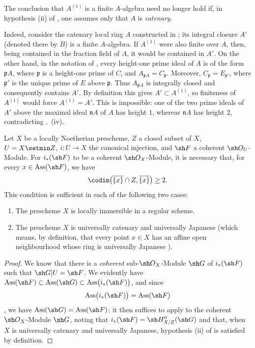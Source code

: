 \begin{remark}[5.11.3]
\label{IV.5.11.3}
The conclusion that $A^{(1)}$ is a finite $A$-algebra need no
longer hold if, in hypothesis {\rm(ii)} of
, one assumes only that $A$ is \emph{catenary}.

Indeed, consider the catenary local ring $A$ constructed in
; its integral closure $A'$ (denoted there by
$B$) is a finite $A$-algebra.  If $A^{(1)}$ were also finite over
$A$, then, being contained in the fraction field of $A$, it would
be contained in $A'$.  On the other hand, in the notation of
, every height-one prime ideal of $A$ is of the
form $\mathfrak pA$, where $\mathfrak p$ is a height-one prime of
$C$, and $A_{\mathfrak pA}=C_{\mathfrak p}$.
Moreover, $C_{\mathfrak p}=E_{\mathfrak p'}$, where
$\mathfrak p'$ is the unique prime of $E$ above $\mathfrak p$.
Thus $A_{\mathfrak pA}$ is integrally closed and consequently
contains $A'$.  By definition this gives
$A'\subset A^{(1)}$, so finiteness of $A^{(1)}$ would force
$A^{(1)}=A'$.  This is impossible: one of the two prime ideals of
$A'$ above the maximal ideal $\mathfrak nA$ of $A$ has height
$1$, whereas $\mathfrak nA$ has height $2$, contradicting
,~(iv).
\end{remark}

\begin{corollary}[5.11.4]
\label{IV.5.11.4}
Let $X$ be a locally Noetherian prescheme, $Z$ a closed subset of $X$,
$U=X\setmin Z$, $i:U\to X$ the canonical injection, and $\sh F$ a
coherent $\sh O_U$-Module.  For $i_*(\sh F)$ to be a coherent
$\sh O_X$-Module, it is necessary that, for every
$x\in\operatorname{Ass}(\sh F)$, we have
\[
  \codim\bigl(\overline{\{x\}}\cap Z,\overline{\{x\}}\bigr)
  \geq2.
\]
This condition is sufficient in each of the following two cases:
\begin{enumerate}[{\rm(i)}]
  \item The prescheme $X$ is locally immersible in a regular scheme.
  \item The prescheme $X$ is universally catenary and universally
  Japanese \textup{(which means, by definition, that every point
  $x\in X$ has an affine open neighbourhood whose ring is}
  universally Japanese \textup{)}.
\end{enumerate}
\end{corollary}

\begin{proof}
We know  that there is a \emph{coherent}
sub-$\sh O_X$-Module $\sh G$ of $i_*(\sh F)$ such that
$\sh G|U=\sh F$.  We evidently have $\operatorname{Ass}(\sh F)
\subset\operatorname{Ass}(\sh G)
\subset\operatorname{Ass}\bigl(i_*(\sh F)\bigr)$,
and since
\[
  \operatorname{Ass}\bigl(i_*(\sh F)\bigr)
  =\operatorname{Ass}(\sh F)
\]
, we have
$\operatorname{Ass}(\sh G)=\operatorname{Ass}(\sh F)$;
it then suffices to apply  to the coherent
$\sh O_X$-Module $\sh G$, noting that $i_*(\sh F)=\sh H^0_{X/Z}(\sh G)$
and that, when $X$ is universally catenary and universally
Japanese, hypothesis {\rm(ii)} of  is satisfied by
definition.
\end{proof}

